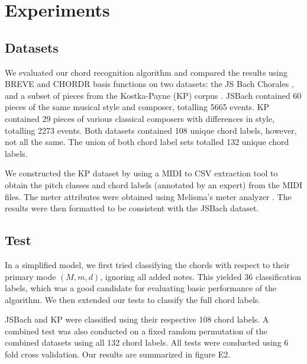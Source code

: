 \documentclass{article} %
\begin{document}
\section{Experiments}

\subsection{Datasets}

We evaluated our chord recognition algorithm and compared the results using BREVE and CHORDR basis functions on two datasets: the JS Bach Chorales \cite{coral}, and a subset of pieces from the Kostka-Payne (KP) corpus \cite{kpcorpus}. JSBach contained 60 pieces of the same musical style and composer, totalling 5665 events. KP contained 29 pieces of various classical composers with differences in style, totalling 2273 events. Both datasets contained 108 unique chord labels, however, not all the same. The union of both chord label sets totalled 132 unique chord labels.

We constructed the KP dataset by using a MIDI to CSV extraction tool \cite{midicsv} to obtain the pitch classes and chord labels (annotated by an expert) from the MIDI files. The meter attributes were obtained using Melisma’s meter analyzer \cite{mitpress}. The results were then formatted to be consistent with the JSBach dataset.

\subsection{Test}

In a simplified model, we first tried classifying the chords with respect to their primary mode $(M, m, d)$, ignoring all added notes. This yielded 36 classification labels, which was a good candidate for evaluating basic performance of the algorithm. We then extended our tests to classify the full chord labels.

JSBach and KP were classified using their respective 108 chord labels. A combined test was also conducted on a fixed random permutation of the combined datasets using all 132 chord labels. All tests were conducted using 6 fold cross validation. Our results are summarized in figure E2.
\end{document}
